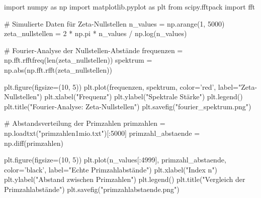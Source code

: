 import numpy as np
import matplotlib.pyplot as plt
from scipy.fftpack import fft

# Simulierte Daten für Zeta-Nullstellen
n_values = np.arange(1, 5000)
zeta_nullstellen = 2 * np.pi * n_values / np.log(n_values)

# Fourier-Analyse der Nullstellen-Abstände
frequenzen = np.fft.rfftfreq(len(zeta_nullstellen))
spektrum = np.abs(np.fft.rfft(zeta_nullstellen))

plt.figure(figsize=(10, 5))
plt.plot(frequenzen, spektrum, color='red', label="Zeta-Nullstellen")
plt.xlabel("Frequenz")
plt.ylabel("Spektrale Stärke")
plt.legend()
plt.title("Fourier-Analyse: Zeta-Nullstellen")
plt.savefig("fourier_spektrum.png")

# Abstandsverteilung der Primzahlen
primzahlen = np.loadtxt("primzahlen1mio.txt")[:5000]
primzahl_abstaende = np.diff(primzahlen)

plt.figure(figsize=(10, 5))
plt.plot(n_values[:4999], primzahl_abstaende, color='black', label="Echte Primzahlabstände")
plt.xlabel("Index n")
plt.ylabel("Abstand zwischen Primzahlen")
plt.legend()
plt.title("Vergleich der Primzahlabstände")
plt.savefig("primzahlabstaende.png")